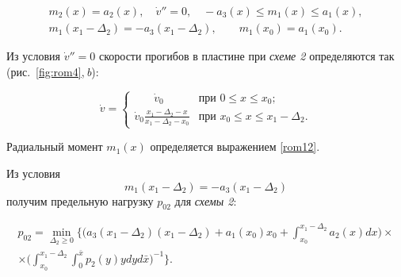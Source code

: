 \begin{gather*}

m_2(x)=a_2(x),\quad {\dot{v}}''=0,\quad -a_3(x)\le m_1(x)\le a_1(x),

\\

m_1(x_1-\Delta_2)=-a_3(x_1-\Delta_2),\qquad m_1(x_0)=a_1(x_0).

\end{gather*}



Из условия ${\dot {v}}''=0$ скорости прогибов в пластине при {\sl схеме 2} определяются так (рис.~\ref{fig:rom4},\,{\sl b}):

$$

\dot{v}=\begin{cases}

~~~~~~~~\dot{v}_0& \text{при }0\le x\le x_0;

\\[2mm]

\displaystyle

\dot{v}_0 \frac{x_1-\Delta_2-x}{x_1-\Delta_2-x_0}& \text{при }x_0\le x\le x_1-\Delta_2.

\end{cases}

$$



Радиальный момент $m_1(x)$ определяется выражением \eqref{rom12}.

Из условия $$m_1(x_1-\Delta_2)=-a_3(x_1-\Delta_2)$$ получим предельную нагрузку $p_{02}$ для {\sl схемы 2}\/:

\begin{multline}

\label{rom17}

p_{02}=\min\limits_{\Delta_2\ge0}

\biggl\{

\biggl(

a_3(x_1-\Delta_2)(x_1-\Delta_2)+a_1(x_0)x_0+

\int_{x_0}^{x_1-\Delta_2} a_2(x) dx

\biggr) \times

\\

\times

\biggl( \int_{x_0}^{x_1-\Delta_2}  \int_0^{\bar{x}}{p_2(y)y}dy   d\bar{x}

\biggr)^{-1}

\biggr\}

.

\end{multline}



